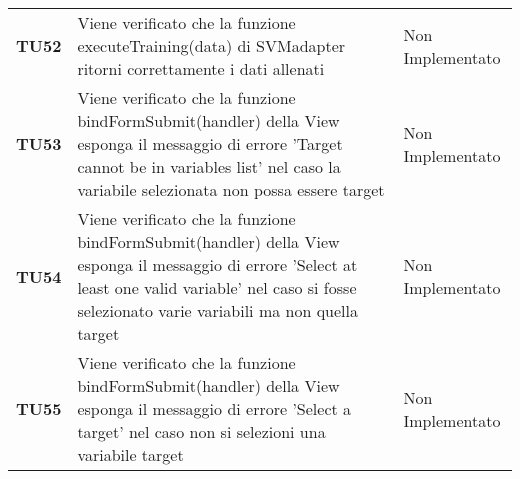 \documentclass[../piano-di-qualifica.tex]{subfiles}
\begin{document}
\begin{longtable}[H]{>{\centering\bfseries}m{2.5cm} >{\centering}m{7.5cm} >{\centering\arraybackslash}m{3.5cm}}
  \textbf{TU52} & Viene verificato che la funzione executeTraining(data) di SVMadapter ritorni correttamente i dati allenati & Non Implementato \\
  \textbf{TU53} & Viene verificato che la funzione bindFormSubmit(handler) della View esponga il messaggio di errore 'Target cannot be in variables list' nel caso la variabile selezionata non possa essere target  & Non Implementato \\
  \textbf{TU54} & Viene verificato che la funzione bindFormSubmit(handler) della View esponga il messaggio di errore 'Select at least one valid variable' nel caso si fosse selezionato varie variabili ma non quella target  & Non Implementato \\
  \textbf{TU55} & Viene verificato che la funzione bindFormSubmit(handler) della View esponga il messaggio di errore 'Select a target' nel caso non si selezioni una variabile target  & Non Implementato \\
\end{longtable}
\end{document}
